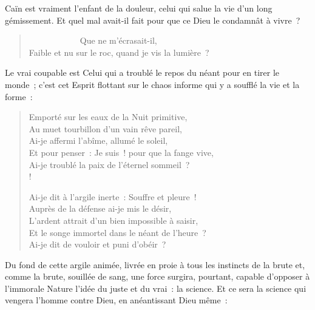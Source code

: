 \documentclass[french,twoside]{book} %
\begin{document}
\noindent Caïn est vraiment l’enfant de la douleur, celui qui salue la vie d’un long gémissement. Et quel mal avait-il fait pour que ce Dieu le condamnât à vivre ?\par


\begin{verse}
            Que ne m’écrasait-il,\\
Faible et nu sur le roc, quand je vis la lumière ?\\
\end{verse}

\noindent Le vrai coupable est Celui qui a troublé le repos du néant pour en tirer le monde ; c’est cet Esprit flottant sur le chaos informe qui y a soufflé la vie et la forme :\par


\begin{verse}
Emporté sur les eaux de la Nuit primitive,\\
Au muet tourbillon d’un vain rêve pareil,\\
Ai-je affermi l’abîme, allumé le soleil,\\
Et pour penser : Je suis ! pour que la fange vive,\\
Ai-je troublé la paix de l’éternel sommeil ?\\!

Ai-je dit à l’argile inerte : Souffre et pleure !\\
Auprès de la défense ai-je mis le désir,\\
L’ardent attrait d’un bien impossible à saisir,\\
Et le songe immortel dans le néant de l’heure ?\\
Ai-je dit de vouloir et puni d’obéir ?\\
\end{verse}

\noindent Du fond de cette argile animée, livrée en proie à tous les instincts de la brute et, comme la brute, souillée de sang, une force surgira, pourtant, capable d’opposer à l’immorale Nature l’idée du juste et du vrai : la science. Et ce sera la science qui vengera l’homme contre Dieu, en anéantissant Dieu même :\par
\end{document}
